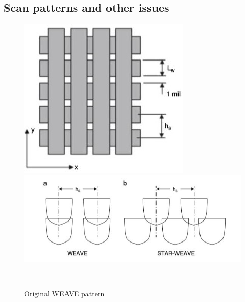 \documentclass[a4paper, twoside, 11pt]{report}
\begin{document}
\subsection{Scan patterns and other issues}
%
\begin{figure}[!t]
  \centering
  \begin{minipage}[b]{0.45\textwidth}
    \includegraphics[width=\textwidth]{weave1}
  \end{minipage}
  \hfill
  \begin{minipage}[b]{0.45\textwidth}
    \includegraphics[width=\textwidth]{weave2}
  \end{minipage}
  \\[1pt]
  \begin{minipage}[t]{0.45\textwidth}
    \caption{Original WEAVE pattern}
  \end{minipage}
  \hfill
  \begin{minipage}[t]{0.45\textwidth}

\end{minipage}
\end{figure}
\end{document}
